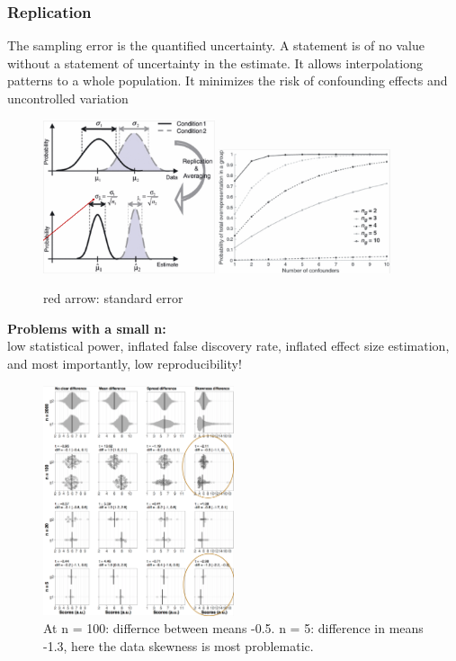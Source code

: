 \documentclass{article}
\begin{document}
\subsubsection{Replication}
The sampling error is the quantified uncertainty. A statement is of no value without a statement of uncertainty in the estimate. It allows interpolationg patterns to a whole population. It minimizes the risk of confounding effects and uncontrolled variation
\begin{figure}[h]
\centering
\includegraphics[width = 0.45\textwidth]{exp-design/replication.png}
\includegraphics[width = 0.45\textwidth]{exp-design/replication2.png}
\caption{red arrow: standard error}
\end{figure}

\textbf{Problems with a small n:} \\
low statistical power, inflated false discovery rate, inflated effect size estimation, and most importantly, low reproducibility!

\begin{figure}[h]
\centering
\includegraphics[width = 0.5\textwidth]{exp-design/small-n.png}
\caption{At n = 100: differnce between means -0.5. n = 5: difference in means -1.3, here the data skewness is most problematic.}
\end{figure}
\end{document}

